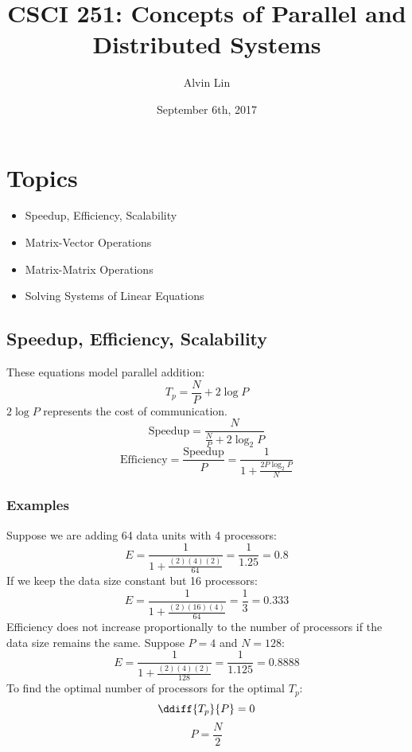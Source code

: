 \documentclass{math}
\title{CSCI 251: Concepts of Parallel and Distributed Systems}
\author{Alvin Lin}
\date{September 6th, 2017}
\begin{document}
\maketitle

\section*{Topics}
\begin{itemize}
  \item Speedup, Efficiency, Scalability
  \item Matrix-Vector Operations
  \item Matrix-Matrix Operations
  \item Solving Systems of Linear Equations
\end{itemize}

\subsection*{Speedup, Efficiency, Scalability}
These equations model parallel addition:
\[ T_p = \frac{N}{P}+2\log P \]
\( 2\log P \) represents the cost of communication.
\[ \text{Speedup} = \frac{N}{\frac{N}{P}+2\log_2 P} \]
\[ \text{Efficiency} = \frac{\text{Speedup}}{P} =
  \frac{1}{1+\frac{2P\log_2 P}{N}} \]

\subsubsection*{Examples}
Suppose we are adding 64 data units with 4 processors:
\[ E = \frac{1}{1+\frac{(2)(4)(2)}{64}} = \frac{1}{1.25} = 0.8 \]
If we keep the data size constant but 16 processors:
\[ E = \frac{1}{1+\frac{(2)(16)(4)}{64}} = \frac{1}{3} = 0.333 \]
Efficiency does not increase proportionally to the number of processors if the
data size remains the same. Suppose \( P = 4 \) and \( N = 128 \):
\[ E = \frac{1}{1+\frac{(2)(4)(2)}{128}} = \frac{1}{1.125} = 0.8888 \]
To find the optimal number of processors for the optimal \( T_p \):
\[ \ddiff{T_p}{P} = 0 \]
\[ P = \frac{N}{2} \]
\end{document}
